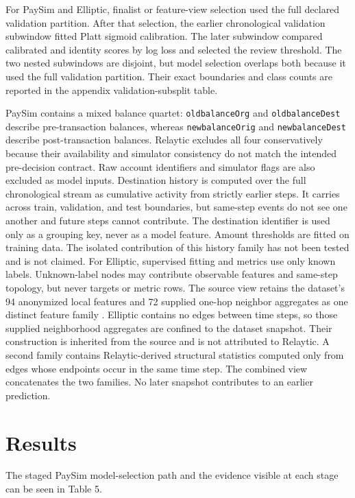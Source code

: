 \documentclass[11pt]{article}
\begin{document}
For PaySim and Elliptic, finalist or feature-view selection used the full declared validation partition. After that selection, the earlier chronological validation subwindow fitted Platt sigmoid calibration. The later subwindow compared calibrated and identity scores by log loss and selected the review threshold. The two nested subwindows are disjoint, but model selection overlaps both because it used the full validation partition. Their exact boundaries and class counts are reported in the appendix validation-subsplit table.

PaySim contains a mixed balance quartet: \nolinkurl{oldbalanceOrg} and \nolinkurl{oldbalanceDest} describe pre-transaction balances, whereas \nolinkurl{newbalanceOrig} and \nolinkurl{newbalanceDest} describe post-transaction balances. Relaytic excludes all four conservatively because their availability and simulator consistency do not match the intended pre-decision contract. Raw account identifiers and simulator flags are also excluded as model inputs. Destination history is computed over the full chronological stream as cumulative activity from strictly earlier steps. It carries across train, validation, and test boundaries, but same-step events do not see one another and future steps cannot contribute. The destination identifier is used only as a grouping key, never as a model feature. Amount thresholds are fitted on training data. The isolated contribution of this history family has not been tested and is not claimed.
For Elliptic, supervised fitting and metrics use only known labels. Unknown-label nodes may contribute observable features and same-step topology, but never targets or metric rows. The source view retains the dataset's 94 anonymized local features and 72 supplied one-hop neighbor aggregates as one distinct feature family \citep{weber2019elliptic}. Elliptic contains no edges between time steps, so those supplied neighborhood aggregates are confined to the dataset snapshot. Their construction is inherited from the source and is not attributed to Relaytic. A second family contains Relaytic-derived structural statistics computed only from edges whose endpoints occur in the same time step. The combined view concatenates the two families. No later snapshot contributes to an earlier prediction.

\section{Results}

The staged PaySim model-selection path and the evidence visible at each stage can be seen in Table 5.
\end{document}
